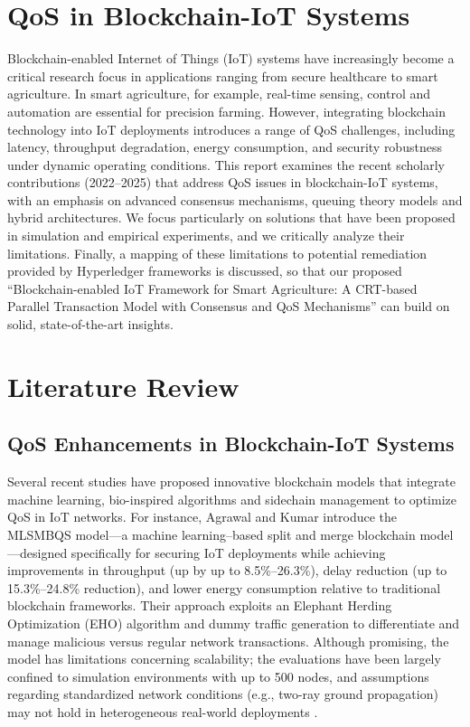 \documentclass[12pt,onecolumn]{IEEEtran} %
\begin{document}
\section*{QoS in Blockchain-IoT Systems}
Blockchain-enabled Internet of Things (IoT) systems have increasingly become a critical research focus in applications ranging from secure healthcare to smart agriculture. In smart agriculture, for example, real-time sensing, control and automation are essential for precision farming. However, integrating blockchain technology into IoT deployments introduces a range of QoS challenges, including latency, throughput degradation, energy consumption, and security robustness under dynamic operating conditions. This report examines the recent scholarly contributions (2022--2025) that address QoS issues in blockchain-IoT systems, with an emphasis on advanced consensus mechanisms, queuing theory models and hybrid architectures. We focus particularly on solutions that have been proposed in simulation and empirical experiments, and we critically analyze their limitations. Finally, a mapping of these limitations to potential remediation provided by Hyperledger frameworks is discussed, so that our proposed ``Blockchain-enabled IoT Framework for Smart Agriculture: A CRT-based Parallel Transaction Model with Consensus and QoS Mechanisms'' can build on solid, state-of-the-art insights.

\section*{Literature Review}

\subsection*{QoS Enhancements in Blockchain-IoT Systems}
Several recent studies have proposed innovative blockchain models that integrate machine learning, bio-inspired algorithms and sidechain management to optimize QoS in IoT networks. For instance, Agrawal and Kumar \cite{agrawal2022mlsmbqsdesignof} introduce the MLSMBQS model---a machine learning--based split and merge blockchain model---designed specifically for securing IoT deployments while achieving improvements in throughput (up by up to 8.5\%--26.3\%), delay reduction (up to 15.3\%--24.8\% reduction), and lower energy consumption relative to traditional blockchain frameworks. Their approach exploits an Elephant Herding Optimization (EHO) algorithm and dummy traffic generation to differentiate and manage malicious versus regular network transactions. Although promising, the model has limitations concerning scalability; the evaluations have been largely confined to simulation environments with up to 500 nodes, and assumptions regarding standardized network conditions (e.g., two-ray ground propagation) may not hold in heterogeneous real-world deployments \cite{agrawal2022mlsmbqsdesignof}.
\end{document}
